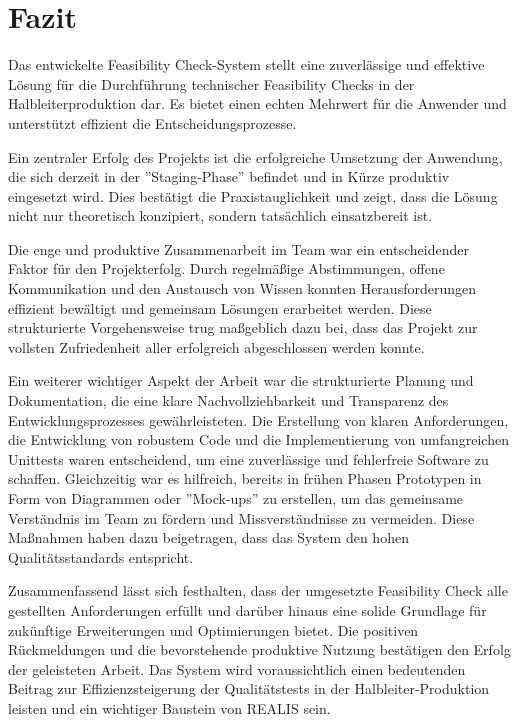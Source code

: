 \chapter{Fazit}

Das entwickelte Feasibility Check-System stellt eine zuverlässige und effektive Lösung für die Durchführung technischer Feasibility Checks in der Halbleiterproduktion dar. Es bietet einen echten Mehrwert für die Anwender und unterstützt effizient die Entscheidungsprozesse.

Ein zentraler Erfolg des Projekts ist die erfolgreiche Umsetzung der Anwendung, die sich derzeit in der ''Staging-Phase'' befindet und in Kürze produktiv eingesetzt wird. Dies bestätigt die Praxistauglichkeit und zeigt, dass die Lösung nicht nur theoretisch konzipiert, sondern tatsächlich einsatzbereit ist.

Die enge und produktive Zusammenarbeit im Team war ein entscheidender Faktor für den Projekterfolg. Durch regelmäßige Abstimmungen, offene Kommunikation und den Austausch von Wissen konnten Herausforderungen effizient bewältigt und gemeinsam Lösungen erarbeitet werden. Diese strukturierte Vorgehensweise trug maßgeblich dazu bei, dass das Projekt zur vollsten Zufriedenheit aller erfolgreich abgeschlossen werden konnte.

Ein weiterer wichtiger Aspekt der Arbeit war die strukturierte Planung und Dokumentation, die eine klare Nachvollziehbarkeit und Transparenz des Entwicklungsprozesses gewährleisteten. Die Erstellung von klaren Anforderungen, die Entwicklung von robustem Code und die Implementierung von umfangreichen Unittests waren entscheidend, um eine zuverlässige und fehlerfreie Software zu schaffen. Gleichzeitig war es hilfreich, bereits in frühen Phasen Prototypen in Form von Diagrammen oder ''Mock-ups'' zu erstellen, um das gemeinsame Verständnis im Team zu fördern und Missverständnisse zu vermeiden. Diese Maßnahmen haben dazu beigetragen, dass das System den hohen Qualitätsstandards entspricht.

Zusammenfassend lässt sich festhalten, dass der umgesetzte Feasibility Check alle gestellten Anforderungen erfüllt und darüber hinaus eine solide Grundlage für zukünftige Erweiterungen und Optimierungen bietet. Die positiven Rückmeldungen und die bevorstehende produktive Nutzung bestätigen den Erfolg der geleisteten Arbeit. Das System wird voraussichtlich einen bedeutenden Beitrag zur Effizienzsteigerung der Qualitätstests in der Halbleiter-Produktion leisten und ein wichtiger Baustein von \gls{REALIS} sein.




